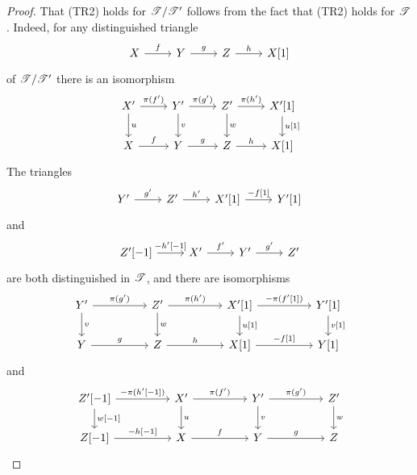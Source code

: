 \documentclass[dissertation.tex]{subfiles}
\begin{document}
\begin{thm}
\begin{proof}
    That (TR2) holds for $\mathscr{T}/\mathscr{T}^\prime$ follows from the fact that (TR2) holds for $\mathscr{T}$.
    Indeed, for any distinguished triangle
    $$\begin{tikzcd}
      X \arrow{r}{f} & Y \arrow{r}{g} & Z \arrow{r}{h} & X[1]
    \end{tikzcd}$$
    of $\mathscr{T}/\mathscr{T}^\prime$ there is an isomorphism
    $$\begin{tikzcd}
      X^\prime \arrow{r}{\pi(f^\prime)}\arrow{d}{u} & Y^\prime \arrow{r}{\pi(g^\prime)}\arrow{d}{v} & Z^\prime \arrow{r}{\pi(h^\prime)}\arrow{d}{w} & X^\prime[1]\arrow{d}{u[1]}\\
      X \arrow{r}{f} & Y \arrow{r}{g} & Z \arrow{r}{h} & X[1]
    \end{tikzcd}$$
    The triangles
    $$\begin{tikzcd}
      Y^\prime \arrow{r}{g^\prime} & Z^\prime \arrow{r}{h^\prime} & X^\prime[1] \arrow{r}{-f[1]} & Y^\prime[1]
    \end{tikzcd}$$
    and
    $$\begin{tikzcd}
      Z^\prime[-1] \arrow{r}{-h^\prime[-1]} & X^\prime \arrow{r}{f^\prime} & Y^\prime\arrow{r}{g^\prime} & Z^\prime
    \end{tikzcd}$$
    are both distinguished in $\mathscr{T}$, and there are isomorphisms
    $$\begin{tikzcd}
      Y^\prime \arrow{rr}{\pi(g^\prime)}\arrow{d}{v} && Z^\prime \arrow{rr}{\pi(h^\prime)}\arrow{d}{w} && X^\prime[1] \arrow{rr}{-\pi(f^\prime[1])}\arrow{d}{u[1]}&& Y^\prime[1]\arrow{d}{v[1]}\\
      Y \arrow{rr}{g} && Z \arrow{rr}{h} && X[1] \arrow{rr}{-f[1]} && Y[1]
    \end{tikzcd}$$
    and
    $$\begin{tikzcd}
      Z^\prime[-1] \arrow{rr}{-\pi(h^\prime[-1])}\arrow{d}{w[-1]} && X^\prime\arrow{rr}{\pi(f^\prime)}\arrow{d}{u} && Y^\prime \arrow{rr}{\pi(g^\prime)}\arrow{d}{v} && Z^\prime \arrow{d}{w}\\
      Z[-1] \arrow{rr}{-h[-1]} && X \arrow{rr}{f} && Y \arrow{rr}{g} && Z
    \end{tikzcd}$$
    

\end{proof}
\end{thm}
\end{document}
